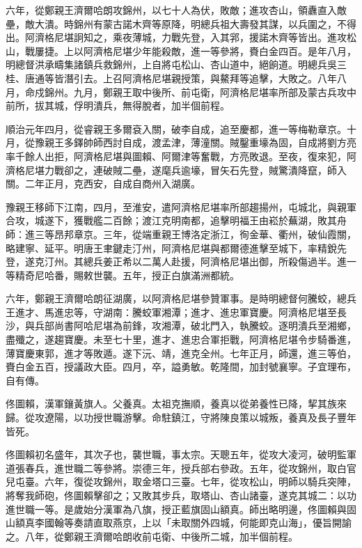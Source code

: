 \begin{pinyinscope}
六年，從鄭親王濟爾哈朗攻錦州，以七十人為伏，敗敵；進攻杏山，領纛直入敵壘，敵大潰。時錦州有蒙古諾木齊等原降，明總兵祖大壽發其謀，以兵圍之，不得出。阿濟格尼堪詗知之，乘夜薄城，力戰先登，入其郛，援諾木齊等皆出。進攻松山，戰屢捷。上以阿濟格尼堪少年能殺敵，進一等參將，賚白金四百。是年八月，明總督洪承疇集諸鎮兵救錦州，上自將屯松山、杏山道中，絕餉道。明總兵吳三桂、唐通等皆潛引去。上召阿濟格尼堪親授策，與鰲拜等追擊，大敗之。八年八月，命戍錦州。九月，鄭親王取中後所、前屯衛，阿濟格尼堪率所部及蒙古兵攻中前所，拔其城，俘明潰兵，無得脫者，加半個前程。

順治元年四月，從睿親王多爾袞入關，破李自成，追至慶都，進一等梅勒章京。十月，從豫親王多鐸帥師西討自成，渡孟津，薄潼關。賊鑿重壕為固，自成將劉方亮率千餘人出拒，阿濟格尼堪與圖賴、阿爾津等奮戰，方亮敗退。至夜，復來犯，阿濟格尼堪力戰卻之，連破賊二壘，遂麾兵逾壕，冒矢石先登，賊驚潰降竄，師入關。二年正月，克西安，自成自商州入湖廣。

豫親王移師下江南，四月，至淮安，遣阿濟格尼堪率所部趨揚州，屯城北，與親軍合攻，城遂下，獲戰艦二百餘；渡江克明南都，追擊明福王由崧於蕪湖，敗其舟師：進三等昂邦章京。三年，從端重親王博洛定浙江，徇金華、衢州，破仙霞關，略建寧、延平。明唐王聿鍵走汀州，阿濟格尼堪與都爾德進擊至城下，率精銳先登，遂克汀州。其總兵姜正希以二萬人赴援，阿濟格尼堪出御，所殺傷過半。進一等精奇尼哈番，賜敕世襲。五年，授正白旗滿洲都統。

六年，鄭親王濟爾哈朗征湖廣，以阿濟格尼堪參贊軍事。是時明總督何騰蛟，總兵王進才、馬進忠等，守湖南：騰蛟軍湘潭；進才、進忠軍寶慶。阿濟格尼堪至長沙，與兵部尚書阿哈尼堪為前鋒，攻湘潭，破北門入，執騰蛟。逐明潰兵至湘鄉，盡殲之，遂趨寶慶。未至七十里，進才、進忠合軍拒戰，阿濟格尼堪令步騎番進，薄寶慶東郭，進才等敗遁。遂下沅、靖，進克全州。七年正月，師還，進三等伯，賚白金五百，授議政大臣。四月，卒，謚勇敏。乾隆間，加封號襄寧。子宜理布，自有傳。

佟圖賴，漢軍鑲黃旗人。父養真。太祖克撫順，養真以從弟養性已降，挈其族來歸。從攻遼陽，以功授世職游擊。命駐鎮江，守將陳良策以城叛，養真及長子豐年皆死。

佟圖賴初名盛年，其次子也，襲世職，事太宗。天聰五年，從攻大凌河，破明監軍道張春兵，進世職二等參將。崇德三年，授兵部右參政。五年，從攻錦州，取白官兒屯臺。六年，復從攻錦州，取金塔口三臺。七年，從攻松山，明師以騎兵突陣，將奪我師砲，佟圖賴擊卻之；又敗其步兵，取塔山、杏山諸臺，遂克其城二：以功進世職一等。是歲始分漢軍為八旗，授正藍旗固山額真。師出略明邊，佟圖賴與固山額真李國翰等奏請直取燕京，上以「未取關外四城，何能即克山海」，優旨開諭之。八年，從鄭親王濟爾哈朗收前屯衛、中後所二城，加半個前程。


\end{pinyinscope}
